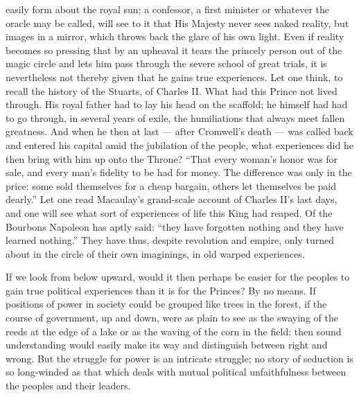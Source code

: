 \documentclass[12pt,a4paper,openany]{book}
\newcommand{\opage}[1]{\marginnote{\footnotesize\textit{[#1]}}}
\begin{document}
easily form about the royal sun; a confessor, a
first minister or whatever the oracle may be called, will see to it
that His Majesty never sees naked reality,
but images in a mirror, which throws back the glare of his
own light. Even if reality becomes so
pressing that by an upheaval it tears the princely
person out of the magic circle and lets him pass through
the severe school of great trials, it is
nevertheless not thereby given that he gains true experiences.
Let one think, to recall the history of the Stuarts, of
Charles II. What had this Prince not lived through. His
royal father had to lay his head on the scaffold;
he himself had had to go through, in several years of exile,
the humiliations that always meet fallen
greatness. And when he then at last --- after Cromwell's
\setcounter{footnote}{0}%
\opage{45}death --- was called back and entered his capital
amid the jubilation of the people, what experiences did he then
bring with him up onto the Throne? ``That every woman's honor was
for sale, and every man's fidelity to be had for money.
The difference was only in the price: some sold themselves for a cheap
bargain, others let themselves be paid dearly.'' Let one read
Macaulay's grand-scale account of Charles II's last
days, and one will see what sort of experiences of life
this King had reaped. Of the Bourbons Napoleon has aptly said: %
``they have forgotten nothing and they have
learned nothing.'' They have thus, despite revolution and
empire, only turned about in the circle of their own imaginings,
in old warped experiences.

If we look from below upward, would it then perhaps be
easier for the peoples to gain true political experiences
than it is for the Princes? By no means. If positions of power
in society could be grouped like trees in
the forest, if the course of government, up and down, were as plain
to see as the swaying of the reeds at the edge of a lake or
as the waving of the corn in the field: then sound
understanding would easily make its way and distinguish between right and
wrong. But the struggle for power is an intricate struggle;
no story of seduction is so long-winded as that which
deals with mutual political unfaithfulness between the peoples
and their leaders.
\end{document}
